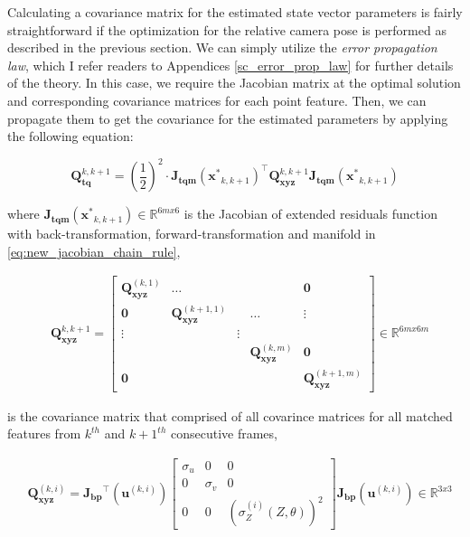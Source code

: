 \documentclass[a4paper]{report}
\numberwithin{figure}{section}
\newcommand{\R}{\mathbb{R}}
\begin{document}
Calculating a covariance matrix for the estimated state vector parameters is
fairly straightforward if the optimization for the relative camera pose is
performed as described in the previous section. We can simply utilize the
\textit{error propagation law}, which I refer readers to Appendices
\ref{sc_error_prop_law} for further details of the theory.  In this case, we
require the Jacobian matrix at the optimal solution and corresponding
covariance  matrices for each point feature. Then, we can propagate them to get
the covariance for the estimated parameters by applying the following equation:

\begin{equation}\label{eq:cov_tq_prop} \mathbf{Q}_{\mathbf{tq}}^{k,k+1} =
(\frac{1}{2})^2 \cdot \mathbf{J_{tqm}}(\mathbf{x^*}_{k,k+1})^\top
\mathbf{Q}_{\mathbf{xyz}}^{k,k+1} \mathbf{J_{tqm}}(\mathbf{x^*}_{k,k+1})
\end{equation}

where $\mathbf{J_{tqm}}(\mathbf{x^*}_{k,k+1}) \in \R^{6mx6}$ is the Jacobian of
extended residuals function with back-transformation, forward-transformation 
and manifold
in \eqref{eq:new_jacobian_chain_rule},

\begin{equation} \begin{aligned} & \mathbf{Q}_{\mathbf{xyz}}^{k,k+1}  =
\begin{bmatrix} \mathbf{Q}_{\mathbf{xyz}}^{(k,1)} & \dots & & &\mathbf{0} \\
\mathbf{0} & \mathbf{Q}_{\mathbf{xyz}}^{(k+1,1)} & &\dots & \vdots  \\ \vdots &
& \vdots &  &\\ &  & & \mathbf{Q}_{\mathbf{xyz}}^{(k,m)} & \mathbf{0} \\
\mathbf{0} &  & & & \mathbf{Q}_{\mathbf{xyz}}^{(k+1,m)} \end{bmatrix} \in
\R^{6mx6m} \end{aligned} \end{equation}

is the covariance matrix that comprised of all covarince matrices for all
matched features from $k^{th}$ and $k+1^{th}$ consecutive frames,

\begin{equation}\label{eq:cov_xyz_prop} \begin{aligned} &
\mathbf{Q}_{\mathbf{xyz}}^{(k,i)} = 
\mathbf{J_{bp}}^\top(\mathbf{u}^{(k,i)})
\begin{bmatrix} \sigma_u & 0 & 0 \\ 0 & \sigma_v & 0 \\ 0 & 0 &
(\sigma_Z^{(i)}(Z, \theta))^2 \end{bmatrix} \mathbf{J_{bp}}(\mathbf{u}^{(k,i)})
\in \R^{3x3} \end{aligned} \end{equation}
\end{document}
